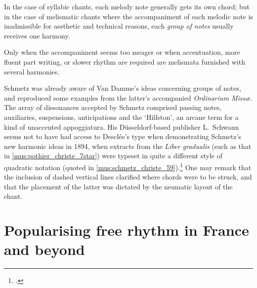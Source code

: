   {\cite[21--2]{SchmetzHarmonisierunggregorianischenChoralgesanges1894}}
{In the case of syllabic chants, each melody note generally gets its own chord; but in the case of melismatic chants where the accompaniment of each melodic note is inadmissible for aesthetic and technical reasons, each \emph{group of notes} usually receives one harmony.

\parindent=10pt
Only when the accompaniment seems too meager or when accentuation, more fluent part writing, or slower rhythm are required are melismata furnished with several harmonies.}
%
\noindent
Schmetz was already aware of Van Damme's ideas concerning groups of notes, and reproduced some examples from the latter's accompanied \emph{Ordinarium Missæ}.
The array of dissonances accepted by Schmetz comprised passing notes, auxiliaries, suspensions, anticipations and the `Hilfston', an arcane term for a kind of unaccented appoggiatura.
His Düsseldorf-based publisher L.\ Schwann seems not to have had access to Desclée's type when demonstrating Schmetz's new harmonic ideas in 1894, when extracts from the \emph{Liber gradualis} (such as that in \cref{mus:pothier_christe_7star}) were typeset in quite a different style of quadratic notation (quoted in \cref{mus:schmetz_christe_59}).\footcites[p.~7*]{PothierLiberGradualis1883}[59]{SchmetzHarmonisierunggregorianischenChoralgesanges1894}
One may remark that the inclusion of dashed vertical lines clarified where chords were to be struck, and that the placement of the latter was dictated by the neumatic layout of the chant.
\noclub[2]


\section{Popularising free rhythm in France and beyond}
\label{sc:france}%
